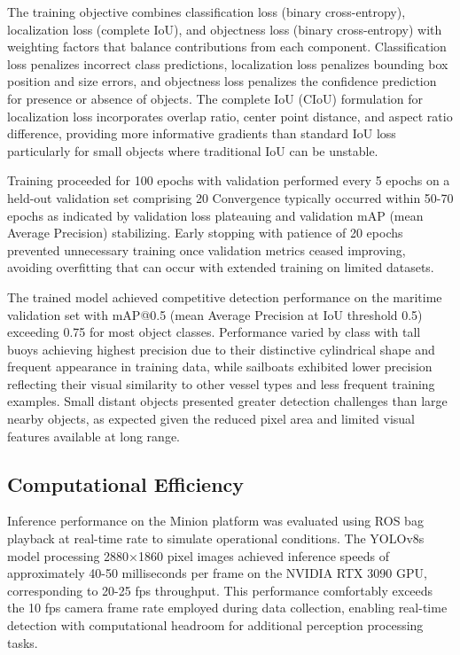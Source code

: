 \documentclass{erauthesis}
\begin{document}
The training objective combines classification loss (binary cross-entropy), localization loss (complete IoU), and objectness loss (binary cross-entropy) with weighting factors that balance contributions from each component.
Classification loss penalizes incorrect class predictions, localization loss penalizes bounding box position and size errors, and objectness loss penalizes the confidence prediction for presence or absence of objects.
The complete IoU (CIoU) formulation for localization loss incorporates overlap ratio, center point distance, and aspect ratio difference, providing more informative gradients than standard IoU loss particularly for small objects where traditional IoU can be unstable.

Training proceeded for 100 epochs with validation performed every 5 epochs on a held-out validation set comprising 20%
Convergence typically occurred within 50-70 epochs as indicated by validation loss plateauing and validation mAP (mean Average Precision) stabilizing.
Early stopping with patience of 20 epochs prevented unnecessary training once validation metrics ceased improving, avoiding overfitting that can occur with extended training on limited datasets.

The trained model achieved competitive detection performance on the maritime validation set with mAP@0.5 (mean Average Precision at IoU threshold 0.5) exceeding 0.75 for most object classes.
Performance varied by class with tall buoys achieving highest precision due to their distinctive cylindrical shape and frequent appearance in training data, while sailboats exhibited lower precision reflecting their visual similarity to other vessel types and less frequent training examples.
Small distant objects presented greater detection challenges than large nearby objects, as expected given the reduced pixel area and limited visual features available at long range.

\subsection{Computational Efficiency} \label{sec:yolo_efficiency}

Inference performance on the Minion platform was evaluated using ROS bag playback at real-time rate to simulate operational conditions.
The YOLOv8s model processing 2880×1860 pixel images achieved inference speeds of approximately 40-50 milliseconds per frame on the NVIDIA RTX 3090 GPU, corresponding to 20-25 \ac{fps} throughput.
This performance comfortably exceeds the 10 \ac{fps} camera frame rate employed during data collection, enabling real-time detection with computational headroom for additional perception processing tasks.
\end{document}
